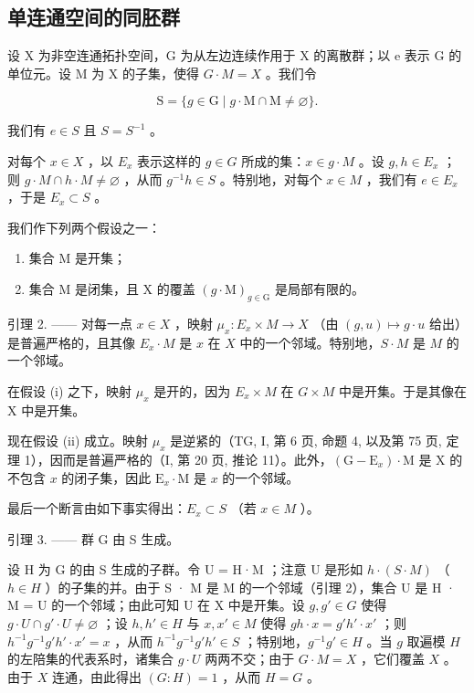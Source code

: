 \subsection{单连通空间的同胚群}

设 X 为非空连通拓扑空间，G 为从左边连续作用于 X 的离散群；以 e 表示 G 的单位元。设 M 为 X 的子集，使得 \(G \cdot M = X\) 。我们令

\[
\mathrm{S} = \{g \in \mathrm{G} \mid g \cdot \mathrm{M} \cap \mathrm{M} \neq \varnothing \}.
\]

我们有 \(e \in S\) 且 \(S = S^{-1}\) 。

对每个 \(x \in X\) ，以 \(E_{x}\) 表示这样的 \(g \in G\) 所成的集：\(x \in g \cdot M\) 。设 \(g, h \in E_{x}\) ；则 \(g \cdot M \cap h \cdot M \neq \varnothing\) ，从而 \(g^{-1}h \in S\) 。特别地，对每个 \(x \in M\) ，我们有 \(e \in E_{x}\) ，于是 \(E_{x} \subset S\) 。

我们作下列两个假设之一：

\begin{enumerate}
\def\labelenumi{(\roman{enumi})}
\item
  集合 M 是开集；
\item
  集合 M 是闭集，且 X 的覆盖 \((g \cdot \mathrm{M})_{g \in \mathrm{G}}\) 是局部有限的。
\end{enumerate}

引理 2. —— 对每一点 \(x \in X\) ，映射 \(\mu_x: E_x \times M \to X\) （由 \((g, u) \mapsto g \cdot u\) 给出）是普遍严格的，且其像 \(E_x \cdot M\) 是 \(x\) 在 \(X\) 中的一个邻域。特别地，\(S \cdot M\) 是 \(M\) 的一个邻域。

在假设 (i) 之下，映射 \(\mu_{x}\) 是开的，因为 \(E_{x} \times M\) 在 \(G \times M\) 中是开集。于是其像在 X 中是开集。

现在假设 (ii) 成立。映射 \(\mu_x\) 是逆紧的（TG, I, 第 6 页, 命题 4, 以及第 75 页, 定理 1），因而是普遍严格的（I, 第 20 页, 推论 11）。此外，\((\mathrm{G} - \mathrm{E}_x) \cdot \mathrm{M}\) 是 X 的不包含 \(x\) 的闭子集，因此 \(\mathrm{E}_x \cdot \mathrm{M}\) 是 \(x\) 的一个邻域。

最后一个断言由如下事实得出：\(E_{x} \subset S\) （若 \(x \in M\) ）。

引理 3. —— 群 G 由 S 生成。

设 H 为 G 的由 S 生成的子群。令 U = H·M ；注意 U 是形如 \(h \cdot (S \cdot M)\) （\(h \in H\) ）的子集的并。由于 S · M 是 M 的一个邻域（引理 2），集合 U 是 H · M = U 的一个邻域；由此可知 U 在 X 中是开集。设 \(g, g' \in G\) 使得 \(g \cdot U \cap g' \cdot U \neq \varnothing\) ；设 \(h, h' \in H\) 与 \(x, x' \in M\) 使得 \(gh \cdot x = g'h' \cdot x'\) ；则 \(h^{-1}g^{-1}g'h' \cdot x' = x\) ，从而 \(h^{-1}g^{-1}g'h' \in S\) ；特别地，\(g^{-1}g' \in H\) 。当 \(g\) 取遍模 \(H\) 的左陪集的代表系时，诸集合 \(g \cdot U\) 两两不交；由于 \(G \cdot M = X\) ，它们覆盖 \(X\) 。由于 \(X\) 连通，由此得出 \((G : H) = 1\) ，从而 \(H = G\) 。

